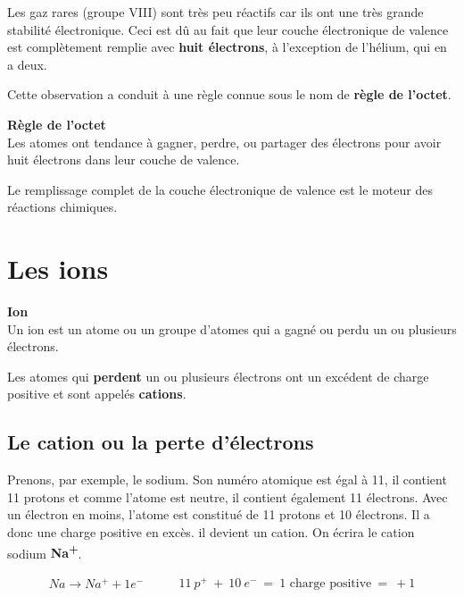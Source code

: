\documentclass[
  11pt,
  a4paper,
  openany]{book}
\begin{document}
Les gaz rares (groupe VIII) sont très peu réactifs car ils ont une très grande stabilité électronique. Ceci est dû au fait que leur couche électronique de valence est complètement remplie avec \textbf{huit électrons}, à l'exception de l'hélium, qui en a deux.

Cette observation a conduit à une règle connue sous le nom de \textbf{règle de l'octet}.

\begin{tcolorbox}
\textbf{Règle de l'octet}\\
Les atomes ont tendance à gagner, perdre, ou partager des électrons pour avoir huit électrons dans leur couche de valence.

\end{tcolorbox}

Le remplissage complet de la couche électronique de valence est le moteur des réactions chimiques.

\section{Les ions}\label{les-ions}

\begin{tcolorbox}
\textbf{Ion}\\
Un ion est un atome ou un groupe d'atomes qui a gagné ou perdu un ou plusieurs électrons.

\end{tcolorbox}

Les atomes qui \textbf{perdent} un ou plusieurs électrons ont un excédent de charge positive et sont appelés \textbf{cations}.

\subsection{Le cation ou la perte d'électrons}\label{le-cation-ou-la-perte-duxe9lectrons}

Prenons, par exemple, le sodium. Son numéro atomique est égal à 11, il contient 11 protons et comme l'atome est neutre, il contient également 11 électrons. Avec un électron en moins, l'atome est constitué de 11 protons et 10 électrons. Il a donc une charge positive en excès. il devient un cation. On écrira le cation sodium \textbf{Na\textsuperscript{+}}.

\[ \begin{split}
        Na \rightarrow Na^+ + 1e^-
    \end{split}
    \qquad
    \begin{split}
        11\:p^{+}\:+\:10\:e^{-}\:=\:\text{1 charge positive}\:=\:+1
    \end{split} \]
\end{document}
